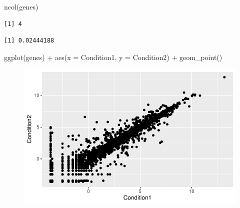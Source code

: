 \documentclass[
  letterpaper,
  DIV=11,
  numbers=noendperiod]{scrartcl}
\newenvironment{Shaded}{\begin{snugshade}}{\end{snugshade}}
\newcommand{\AttributeTok}[1]{\textcolor[rgb]{0.40,0.45,0.13}{#1}}
\newcommand{\FunctionTok}[1]{\textcolor[rgb]{0.28,0.35,0.67}{#1}}
\newcommand{\NormalTok}[1]{\textcolor[rgb]{0.00,0.23,0.31}{#1}}
\newcommand{\OtherTok}[1]{\textcolor[rgb]{0.00,0.23,0.31}{#1}}
\newcommand{\SpecialCharTok}[1]{\textcolor[rgb]{0.37,0.37,0.37}{#1}}
\newcommand{\StringTok}[1]{\textcolor[rgb]{0.13,0.47,0.30}{#1}}
\begin{document}
\begin{Shaded}
\begin{Highlighting}[]
\FunctionTok{ncol}\NormalTok{(genes)}
\end{Highlighting}
\end{Shaded}

\begin{verbatim}
[1] 4
\end{verbatim}

\begin{Shaded}
\end{Shaded}

\begin{verbatim}
[1] 0.02444188
\end{verbatim}

\begin{Shaded}
\begin{Highlighting}[]
\FunctionTok{ggplot}\NormalTok{(genes) }\SpecialCharTok{+} \FunctionTok{aes}\NormalTok{(}\AttributeTok{x =}\NormalTok{ Condition1, }\AttributeTok{y =}\NormalTok{ Condition2) }\SpecialCharTok{+} \FunctionTok{geom\_point}\NormalTok{()}
\end{Highlighting}
\end{Shaded}

\begin{figure}[H]

{\centering \includegraphics{class05_files/figure-pdf/unnamed-chunk-3-1.pdf}

}

\end{figure}
\end{document}
